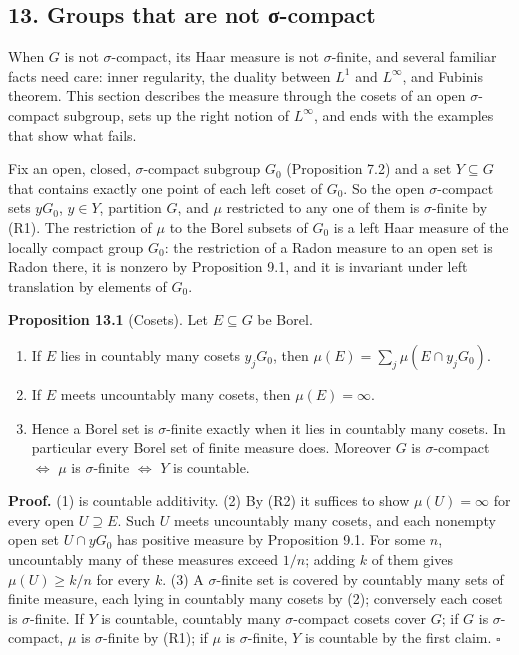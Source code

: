 \documentclass[
  english,
  11pt,
  a4paper,
]{article}
\newcounter{none} %
\providecommand{\tightlist}{%
  \setlength{\itemsep}{0pt}\setlength{\parskip}{0pt}}
\begin{document}
\subsection[13. Groups that are not
σ-compact]{\texorpdfstring{\protect\hypertarget{haar-measure-on-locally-compact-groups--oa-fnd-hm-09}{}{}\protect\hypertarget{haar-measure-on-locally-compact-groups--OA-FND-HM-14}{}{}\protect\hypertarget{haar-measure-on-locally-compact-groups--oa-fnd-hm-14}{}{}13.
Groups that are not
σ-compact}{13. Groups that are not σ-compact}}\label{haar-measure-on-locally-compact-groups--OA-FND-HM-09}

When \(G\) is not \(\sigma\)-compact, its Haar measure is not
\(\sigma\)-finite, and several familiar facts need care: inner
regularity, the duality between \(L^1\) and \(L^\infty\), and
Fubini\textquotesingle s theorem. This section describes the measure
through the cosets of an open \(\sigma\)-compact subgroup, sets up the
right notion of \(L^\infty\), and ends with the examples that show what
fails.

Fix an open, closed, \(\sigma\)-compact subgroup \(G_0\) (Proposition
7.2) and a set \(Y\subseteq G\) that contains exactly one point of each
left coset of \(G_0\). So the open \(\sigma\)-compact sets \(yG_0\),
\(y\in Y\), partition \(G\), and \(\mu\) restricted to any one of them
is \(\sigma\)-finite by (R1). The restriction of \(\mu\) to the Borel
subsets of \(G_0\) is a left Haar measure of the locally compact group
\(G_0\): the restriction of a Radon measure to an open set is Radon
there, it is nonzero by Proposition 9.1, and it is invariant under left
translation by elements of \(G_0\).

\textbf{Proposition 13.1} (Cosets). Let \(E\subseteq G\) be Borel.

\begin{enumerate}
\tightlist
\item
  If \(E\) lies in countably many cosets \(y_jG_0\), then
  \(\mu(E)=\sum_j\mu(E\cap y_jG_0)\).
\item
  If \(E\) meets uncountably many cosets, then \(\mu(E)=\infty\).
\item
  Hence a Borel set is \(\sigma\)-finite exactly when it lies in
  countably many cosets. In particular every Borel set of finite measure
  does. Moreover \(G\) is \(\sigma\)-compact \(\iff\) \(\mu\) is
  \(\sigma\)-finite \(\iff\) \(Y\) is countable.
\end{enumerate}

\textbf{Proof.} (1) is countable additivity. (2) By (R2) it suffices to
show \(\mu(U)=\infty\) for every open \(U\supseteq E\). Such \(U\) meets
uncountably many cosets, and each nonempty open set \(U\cap yG_0\) has
positive measure by Proposition 9.1. For some \(n\), uncountably many of
these measures exceed \(1/n\); adding \(k\) of them gives
\(\mu(U)\geq k/n\) for every \(k\). (3) A \(\sigma\)-finite set is
covered by countably many sets of finite measure, each lying in
countably many cosets by (2); conversely each coset is
\(\sigma\)-finite. If \(Y\) is countable, countably many
\(\sigma\)-compact cosets cover \(G\); if \(G\) is \(\sigma\)-compact,
\(\mu\) is \(\sigma\)-finite by (R1); if \(\mu\) is \(\sigma\)-finite,
\(Y\) is countable by the first claim. \(\square\)
\end{document}
